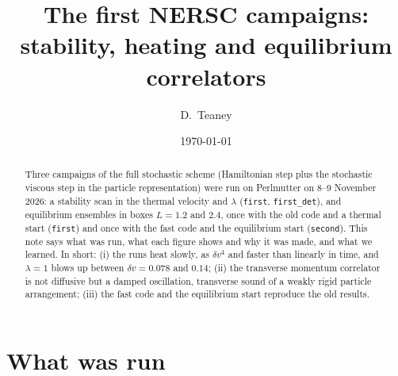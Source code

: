 \documentclass[11pt,aps,preprint,nofootinbib,superscriptaddress,tightenlines]{revtex4-2}
\begin{document}
\title{The first NERSC campaigns: stability, heating and equilibrium correlators}
\author{D.~Teaney}
\date{\today}

\begin{abstract}
Three campaigns of the full stochastic scheme (Hamiltonian step plus the stochastic
viscous step in the particle representation) were run on Perlmutter on 8--9 November
2026: a stability scan in the thermal velocity and $\lambda$ (\texttt{first},
\texttt{first\_det}), and equilibrium ensembles in boxes $L=1.2$ and $2.4$, once with the
old code and a thermal start (\texttt{first}) and once with the fast code and the
equilibrium start (\texttt{second}).  This note says what was run, what each figure shows
and why it was made, and what we learned.  In short: (i) the runs heat slowly, as $\delta
v^4$ and faster than linearly in time, and $\lambda=1$ blows up between $\delta v=0.078$
and $0.14$; (ii) the transverse momentum correlator is not diffusive but a damped
oscillation, transverse sound of a weakly rigid particle arrangement; (iii) the fast code
and the equilibrium start reproduce the old results.
\end{abstract}

\maketitle

\section{What was run}
\label{sec:runs}
\end{document}
